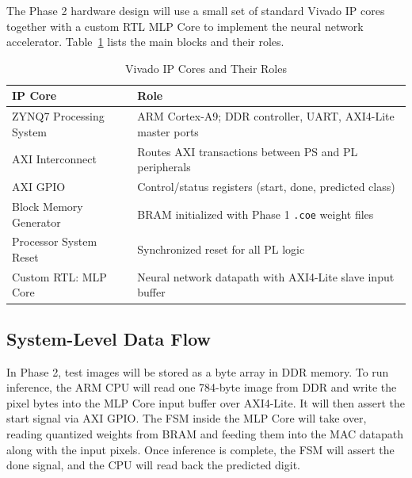 \documentclass[12pt, letterpaper]{article}
\begin{document}
The Phase 2 hardware design will use a small set of standard Vivado IP cores together with a custom RTL MLP Core to implement the neural network accelerator.
Table~\ref{tab:ip_cores} lists the main blocks and their roles.

\begin{table}[H]
\centering
\caption{Vivado IP Cores and Their Roles}
\label{tab:ip_cores}
\begin{tabular}{lp{9cm}}
\toprule
\textbf{IP Core} & \textbf{Role} \\
\midrule
ZYNQ7 Processing System  & ARM Cortex-A9; DDR controller, UART, AXI4-Lite master ports \\
AXI Interconnect         & Routes AXI transactions between PS and PL peripherals \\
AXI GPIO                 & Control/status registers (start, done, predicted class) \\
Block Memory Generator   & BRAM initialized with Phase 1 \texttt{.coe} weight files \\
Processor System Reset   & Synchronized reset for all PL logic \\
Custom RTL: MLP Core     & Neural network datapath with AXI4-Lite slave input buffer \\
\bottomrule
\end{tabular}
\end{table}

\subsection{System-Level Data Flow}

In Phase 2, test images will be stored as a byte array in DDR memory. To run inference, the ARM CPU will read one 784-byte image from DDR and write the pixel bytes into the MLP Core
input buffer over AXI4-Lite. It will then assert the start signal via AXI GPIO. The FSM inside the MLP Core will take over, reading quantized weights from BRAM and feeding them into
the MAC datapath along with the input pixels. Once inference is complete, the FSM will assert the done signal, and the CPU will read back the predicted digit.
\end{document}
